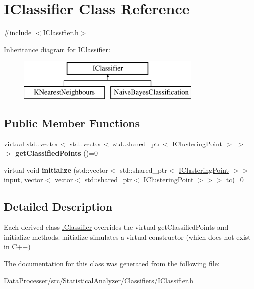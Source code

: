 \hypertarget{classIClassifier}{}\section{I\+Classifier Class Reference}
\label{classIClassifier}


{\ttfamily \#include $<$I\+Classifier.\+h$>$}

Inheritance diagram for I\+Classifier\+:\begin{figure}[H]
\begin{center}
\leavevmode
\includegraphics[height=2.000000cm]{classIClassifier}
\end{center}
\end{figure}
\subsection*{Public Member Functions}
\begin{DoxyCompactItemize}
\item 
\mbox{\label{classIClassifier_ae16ef894fd72f4d94986f6d68a9d43c5}} 
virtual std\+::vector$<$ std\+::vector$<$ std\+::shared\+\_\+ptr$<$ \hyperlink{classIClusteringPoint}{I\+Clustering\+Point} $>$ $>$ $>$ {\bfseries get\+Classified\+Points} ()=0
\item 
\mbox{\label{classIClassifier_ab0033ae8e780d741ff1d70c4473ee385}} 
virtual void {\bfseries initialize} (std\+::vector$<$ std\+::shared\+\_\+ptr$<$ \hyperlink{classIClusteringPoint}{I\+Clustering\+Point} $>$$>$ input, vector$<$ vector$<$ std\+::shared\+\_\+ptr$<$ \hyperlink{classIClusteringPoint}{I\+Clustering\+Point} $>$$>$$>$ tc)=0
\end{DoxyCompactItemize}


\subsection{Detailed Description}
Each derived class \hyperlink{classIClassifier}{I\+Classifier} overrides the virtual \textquotesingle{}get\+Classified\+Points\textquotesingle{} and \textquotesingle{}initialize\textquotesingle{} methods. \textquotesingle{}initialize\textquotesingle{} simulates a virtual constructor (which does not exist in C++) 

The documentation for this class was generated from the following file\+:\begin{DoxyCompactItemize}
\item 
Data\+Processer/src/\+Statistical\+Analyzer/\+Classifiers/I\+Classifier.\+h\end{DoxyCompactItemize}
